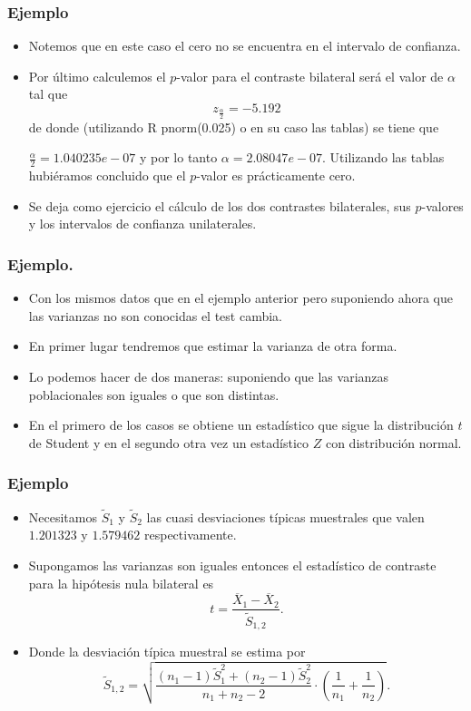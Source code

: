 \begin{frame}
\frametitle{Ejemplo}
\begin{itemize}
\item  Notemos que en este caso el cero no se encuentra en el intervalo de confianza.
\item Por último calculemos el $p$-valor para el contraste bilateral será el valor de $\alpha$ tal que 
$$z_{\frac{\alpha}{2}}=-5.192 $$ de donde  (utilizando R  pnorm(0.025) o en su caso las tablas) se tiene que 

 $\frac{\alpha}{2}= 1.040235 e-07$ y por lo tanto $\alpha=2.08047 e-07$. Utilizando las tablas hubiéramos concluido que el $p$-valor es prácticamente cero.
\item Se deja como ejercicio el cálculo de los dos contrastes bilaterales, sus $p$-valores y los intervalos de confianza unilaterales.
\end{itemize}
\end{frame}

\begin{frame}
\frametitle{Ejemplo.}
\begin{itemize}
\item Con los mismos datos que en el ejemplo anterior pero suponiendo ahora que las varianzas no son conocidas el test cambia.
\item  En primer lugar tendremos que estimar la varianza de otra forma.
\item  Lo podemos hacer de dos maneras: suponiendo que las varianzas poblacionales son iguales o que son distintas.
\item En el primero de los casos se obtiene un estadístico que sigue la distribución $t$ de Student y en el segundo otra vez un estadístico $Z$ con distribución normal.
\end{itemize}
\end{frame}

\begin{frame}
\frametitle{Ejemplo}
\begin{itemize}
\item Necesitamos $\tilde{S}_1$ y $\tilde{S}_2$ las cuasi desviaciones típicas muestrales que valen $1.201323$ y $1.579462$ respectivamente.
\item Supongamos las varianzas son iguales entonces el estadístico de contraste para la hipótesis nula bilateral es
$$t=\frac{\overline{X}_1 -\overline{X}_2}{
\tilde{S}_{1,2}}.$$
\item Donde la desviación típica muestral se estima por $$\tilde{S}_{1,2}=\sqrt{
\frac{(n_1-1)\tilde{S}_1^2 +(n_2 -1)\tilde{S}_2^2}{n_1 +n_2
-2}\cdot\left(\frac{1}{n_1}+\frac{1}{n_2}\right)}.$$ 
\end{itemize}
\end{frame}

